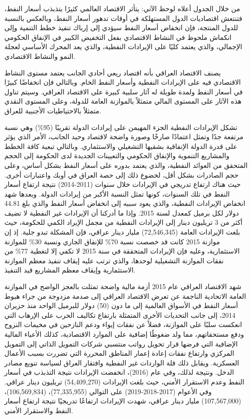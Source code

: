 \documentclass[10pt,a4paper]{report}
\begin{document}
\begin{doublespacing}
من خلال الجدول أعلاه لوحظ الآتي: 
يتأثر الاقتصاد العالمي كثيرًا بتذبذب أسعار النفط، فتنتعش اقتصاديات الدول المستهلكة في أوقات تدهور أسعار النفط، وبالعكس بالنسبة للدول المنتجة، فإن انخفاض أسعار النفط سيؤدي إلى إرباك تنفيذ خطط التنمية وإلى انكماش ملحوظ في النشاط الاقتصادي بفعل التخفيض الكبير في الإنفاق الحكومي الإجمالي، والذي يعتمد كليًا على الإيرادات النفطية، والذي يعد المحرك الأساسي لعجلة النمو والنشاط الاقتصادي. 

يصنف الاقتصاد العراقي بأنه اقتصاد ريعي أحادي الجانب يعتمد مستوى النشاط الاقتصادي فيه على الإيرادات النفطية وأسعار النفط الخام. وبالتالي فإن انخفاضًا كبيرًا في أسعار النفط ولمدة طويلة له آثار سلبية كبيرة على الاقتصاد العراقي. وسيتم تناول هذه الآثار على المستوى المالي متمثلاً بالموازنة العامة للدولة، وعلى المستوى النقدي متمثلاً بالاحتياطيات الأجنبية للعراق.

تشكل الإيرادات النفطية الجزء المهيمن على إيرادات الدولة تقريبًا (95\%) وهي نسبة مرتفعة جدًا وتمثل اعتمادًا صارخًا وصورة واضحة لاقتصاد وحيد الجانب، الأمر الذي يؤثر على قدرة الدولة الإنفاقية بشقيها التشغيلي والاستثماري. وبالتالي تبعية كافة الخطط والمشاريع التنموية والإنفاق الحكومي والتعيينات الجديدة لدى الحكومة إلى الحجم المتحقق من العوائد النفطية، والذي يعتمد بدوره على أسعار النفط بشكل أساس، وعلى حجم الصادرات بشكل أقل، لخضوع ذلك إلى حصة العراق في أوبك واعتبارات أخرى. حيث هناك ارتفاع تدريجي في الإيرادات خلال سنوات (2011-2014) نتيجة ارتفاع أسعار النفط في تلك السنوات، كونها تمثل النسبة الأكبر من إيرادات الدولة. وبعدها شهد انخفاض الإيرادات النفطية، والذي يعود سببه إلى انخفاض أسعار النفط والذي بلغ \textenglish{44.81} دولار لكل برميل كمعدل لسنة 2015. وإذا ما أدركنا أن الإيرادات غير النفطية لا تضيف أكثر من 3 تريليون دينار إلى الإيرادات النفطية من مجمل الإيراد الكمي للحكومة، حيث بلغت الإيرادات العامة (72,546,345) مليار دينار عراقي، فإن المشكلة تبدو جلية. إذ إن موازنة 2015 كانت قد خصصت نسبة 70\% للإنفاق الجاري ونسبة 30\% للموازنة الاستثمارية، وعليه فإن الإيرادات المتحققة في سنة 2015 لا تكفي إلا لتغطية 77\% من نفقات الموازنة التشغيلية لوحدها، والذي ترتب عليه إيقاف تنفيذ معظم الموازنة الاستثمارية وإيقاف معظم المشاريع قيد التنفيذ.

شهد الاقتصاد العراقي عام 2015 أزمة مالية واضحة تمثلت بالعجز الواضح في الموازنة العامة الاتحادية الناجمة عن تعرض الاقتصاد العراقي إلى صدمة مزدوجة من جراء هبوط أسعار النفط في الأسواق العالمية إلى ما دون (50) دولار للبرميل الواحد منذ حزيران 2014، إلى جانب التحديات الأخرى المتمثلة بارتفاع تكاليف الحرب على الإرهاب التي انعكست سلبًا على الموازنة، فضلاً عن نفقات إيواء ودعم النازحين في مخيمات النزوح ودفع مستحقاتهم، مما ولد ضغوطًا إضافية على الموارد الاقتصادية، كذلك الأعباء المالية الإضافية التي فرضها قرار تحويل رواتب منتسبي شركات التمويل الذاتي إلى التمويل المركزي وارتفاع نفقات إعادة إعمار المناطق المحررة التي تضررت بسبب الأعمال العسكرية. ويقابل ذلك قلة الواردات غير النفطية وافتقار العراق لسياسة تنويع مصادر الدخل. ونتيجة لذلك، وفي عام (2016)، انخفضت الإيرادات نتيجة التذبذب في أسعار النفط وعدم الاستقرار الأمني، حيث بلغت الإيرادات (54,409,270) تريليون دينار عراقي. وفي الأعوام (2017-2018-2019) على التوالي (77,335,955)، (106,569,834)، (107,567,000) مليار دينار عراقي، شهدت الإيرادات ارتفاعًا تدريجيًا نتيجة ارتفاع أسعار النفط والاستقرار الأمني. 


\end{doublespacing}
\end{document}
